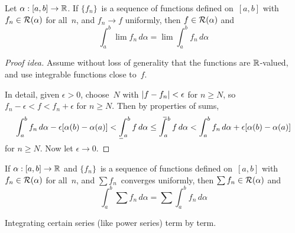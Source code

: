 \begin{thm}
Let \(\alpha:[a,b]\to\mathbb{R}\). If \(\{f_n\}\)~is a sequence of functions defined on~\([a,b]\) with \(f_n\in\mathcal{R}(\alpha)\) for all~\(n\), and \(f_n\to f\) uniformly, then \(f\in\mathcal{R}(\alpha)\) and
\[\int_a^b\lim f_n\,d\alpha=\lim\int_a^b f_n\,d\alpha\]
\end{thm}
\begin{proof}[Proof idea]
Assume without loss of generality that the functions are \(\mathbb{R}\)-valued, and use integrable functions close to~\(f\).

In detail, given \(\epsilon>0\), choose~\(N\) with \(|{f-f_n}|<\epsilon\) for \(n\ge N\), so \(f_n-\epsilon<f<f_n+\epsilon\) for \(n\ge N\). Then by properties of sums,
\[\int_a^b f_n\,d\alpha-\epsilon[\alpha(b)-\alpha(a)]<\lowerint{a}{b}f\,d\alpha\le\upperint{a}{b}f\,d\alpha<\int_a^b f_n\,d\alpha+\epsilon[\alpha(b)-\alpha(a)]\]
for \(n\ge N\). Now let \(\epsilon\to0\).
\end{proof}

\begin{cor}
If \(\alpha:[a,b]\to\mathbb{R}\) and \(\{f_n\}\)~is a sequence of functions defined on~\([a,b]\) with \(f_n\in\mathcal{R}(\alpha)\) for all~\(n\), and \(\sum f_n\)~converges uniformly, then \(\sum f_n\in\mathcal{R}(\alpha)\) and
\[\int_a^b\sum f_n\,d\alpha=\sum\int_a^b f_n\,d\alpha\]
\end{cor}
\begin{app}
Integrating certain series (like power series) term by term.
\end{app}

